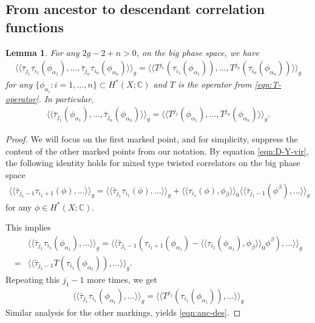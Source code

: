 \documentclass[12pt,reqno]{amsart}
\theoremstyle{plain}
\newtheorem{lemma}[theorem]{Lemma}
\theoremstyle{definition}
\theoremstyle{remark}
\begin{document}
\begin{appendix}
\subsection{From ancestor to descendant correlation functions}\label{subsec:anc-des} 
\begin{lemma}\label{lem:anc-desc}
For any $2g-2+n>0$,  on the big phase space, we have
\begin{align}\label{eqn:anc-des}
\langle\langle\bar\tau_{j_1}\tau_{i_1}(\phi_{\alpha_1}),\dots,\bar\tau_{j_n}\tau_{i_n}(\phi_{\alpha_n})\rangle\rangle_g =   \langle\langle  T^{j_1}(\tau_{i_1}(\phi_{\alpha_1})),\dots,  T^{j_n}(\tau_{i_n}(\phi_{\alpha_n}))\rangle\rangle_g 
\end{align}
for any $\{\phi_{\alpha_i}: i=1,\dots,n\}\subset H^*(X;\mathbb{C})$ and $T$ is the operator from \eqref{eqn:T-operator}.
In particular,
\begin{align*}
\langle\langle\bar\tau_{j_1}(\phi_{\alpha_1}),\dots,\bar\tau_{j_n}(\phi_{\alpha_n})\rangle\rangle_g =   \langle\langle  T^{j_1}(\phi_{\alpha_1}),\dots,  T^{j_n}(\phi_{\alpha_n})\rangle\rangle_g. 
\end{align*}
\end{lemma}
\begin{proof}
  We will focus on the first marked point, and for simplicity, suppress the content of the other marked
  points from our notation.
  By equation \eqref{eqn:D-Y-vir}, the following identity holds for mixed type twisted correlators on the big phase space
\begin{align}
\label{eqn:des-anc-recursion}
\langle\langle\bar{\tau}_{j_1-1}\tau_{i_1+1}(\phi),\dots\rangle\rangle_g=
\langle\langle\bar{\tau}_{j_1}\tau_{i_1}(\phi),\dots\rangle\rangle_g
+\langle\langle \tau_{i_1}(\phi),\phi_\beta\rangle\rangle_0\langle\langle\bar{\tau}_{j_1-1}(\phi^\beta),\dots\rangle\rangle_g
\end{align}
for any $\phi\in H^*(X;\mathbb{C})$.

This implies
\begin{align*}
&\langle\langle\bar{\tau}_{j_1}\tau_{i_1}(\phi_{\alpha_1}),\dots\rangle\rangle_g 
=\langle\langle\bar\tau_{j_1-1}\left(\tau_{i_1+1}(\phi_{\alpha_1})-\langle\langle\tau_{i_1}(\phi_{\alpha_1}),\phi_\beta\rangle\rangle_0\phi^\beta\right),\dots\rangle\rangle_g
\\=&\langle\langle\bar\tau_{j_1-1}T(\tau_{i_1}(\phi_{\alpha_1})),\dots\rangle\rangle_g.
\end{align*}
Repeating this $j_1 - 1$ more times, we get
\begin{align*}
  \langle\langle\bar{\tau}_{j_1}\tau_{i_1}(\phi_{\alpha_1}),\dots\rangle\rangle_g 
  =\langle\langle T^{j_1}(\tau_{i_1}(\phi_{\alpha_1})),\dots\rangle\rangle_g
\end{align*}
Similar analysis for the other markings, yields \eqref{eqn:anc-des}.
\end{proof}


\end{appendix}
\end{document}
